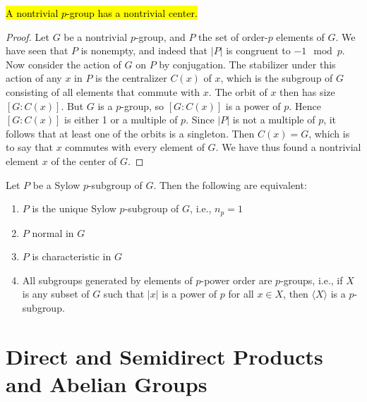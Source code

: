 \nl

\begin{thm}
\hl{A nontrivial $p$-group has a nontrivial center.}
\end{thm}

\begin{proof}
Let $G$ be a nontrivial $p$-group, and $P$ the set of order-$p$ elements of $G$. We have seen that $P$ is nonempty, and indeed that $|P|$ is congruent to $-1 \mod p$. Now consider the action of $G$ on $P$ by conjugation. The stabilizer under this action of any $x$ in $P$ is the centralizer $C(x)$ of $x$, which is the subgroup of $G$ consisting of all elements that commute with $x$. The orbit of $x$ then has size $[G:C(x)]$. But $G$ is a $p$-group, so $[G:C(x)]$ is a power of $p$. Hence $[G:C(x)]$ is either 1 or a multiple of $p$. Since $|P|$ is not a multiple of $p$, it follows that at least one of the orbits is a singleton. Then $C(x)=G$, which is to say that $x$ commutes with every element of $G$. We have thus found a nontrivial element $x$ of the center of $G$.
\end{proof}

\nl

\begin{cor}
Let $P$ be a Sylow $p$-subgroup of $G$. Then the following are equivalent:
\begin{enumerate}
\item $P$ is the unique Sylow $p$-subgroup of $G$, i.e., $n_p = 1$
\item $P$ normal in $G$
\item $P$ is characteristic in $G$
\item All subgroups generated by elements of $p$-power order are $p$-groups, i.e., if $X$ is any subset of $G$ such that $|x|$ is a power of $p$ for all $x\in X$, then $\langle X\rangle$ is a $p$-subgroup.
\end{enumerate}
\end{cor}



\section{Direct and Semidirect Products and Abelian Groups}

\setcounter{thm}{0}

